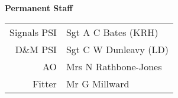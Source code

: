 \vspace*{5mm}

\begin{center}
  \Large
  \textbf{Permanent Staff}
\end{center}

\begin{center}
  \small
  \begin{tabular}{rl}
    Signals PSI & Sgt A C Bates (KRH) \\
    D\&M PSI & Sgt C W Dunleavy (LD) \\
    AO & Mrs N Rathbone-Jones \\
    Fitter & Mr G Millward \\
  \end{tabular}
\end{center}
